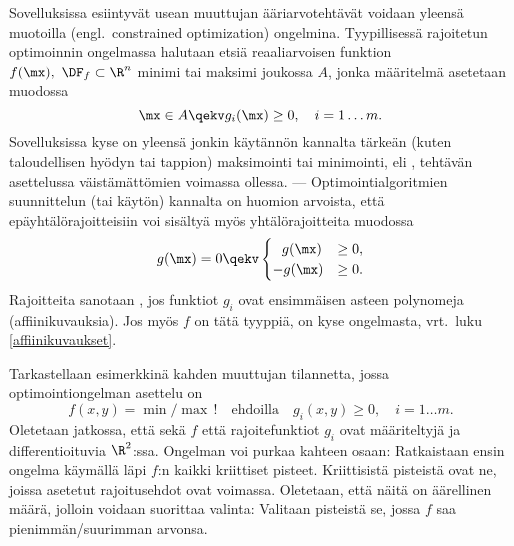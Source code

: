 Sovelluksissa esiintyvät usean muuttujan ääriarvotehtävät voidaan yleensä muotoilla 
 (engl.\ constrained optimization) ongelmina. Tyypillisessä 
rajoitetun optimoinnin ongelmassa halutaan etsiä reaaliarvoisen funktion
$f(\mx),\ \DF_f\subset\R^n$ minimi tai maksimi joukossa $A$, jonka määritelmä asetetaan
muodossa
\[ 
\mx \in A \qekv g_i(\mx) \ge 0, \quad i=1 \ldots m. 
\]
Sovelluksissa kyse on yleensä jonkin käytännön kannalta tärkeän (kuten taloudellisen hyödyn tai
tappion) maksimointi tai minimointi, eli
, tehtävän asettelussa väistämättömien  voimassa ollessa.
--- Optimointialgoritmien suunnittelun (tai käytön)
kannalta on huomion arvoista, että epäyhtälörajoitteisiin voi sisältyä myös yhtälörajoitteita
muodossa
\[ 
g(\mx)= 0 \qekv \begin{cases} \ \ g(\mx) &\ge 0, \\ -g(\mx) &\ge 0. \end{cases} 
\]
%
Rajoitteita sanotaan , jos funktiot $g_i$ ovat ensimmäisen asteen polynomeja
(affiinikuvauksia). Jos myös $f$ on tätä tyyppiä, on kyse
%
 ongelmasta, vrt.\ luku \ref{affiinikuvaukset}.

Tarkastellaan esimerkkinä kahden muuttujan tilannetta, jossa optimointiongelman asettelu on
\[
f(x,y)=\min/\max\,! \quad \text{ehdoilla} \quad g_i(x,y) \ge 0, \quad i=1 \ldots m.
\]
Oletetaan jatkossa, että sekä $f$ että rajoitefunktiot $g_i$ ovat määriteltyjä ja 
differentioituvia $\R^2$:ssa. Ongelman voi purkaa kahteen osaan: Ratkaistaan ensin 
 ongelma käymällä läpi $f$:n kaikki kriittiset pisteet. Kriittisistä 
%
pisteistä  ovat ne, joissa asetetut rajoitusehdot ovat voimassa. Oletetaan, että
näitä on äärellinen määrä, jolloin voidaan suorittaa valinta: Valitaan pisteistä se, jossa $f$
saa pienimmän/suurimman arvonsa. 

